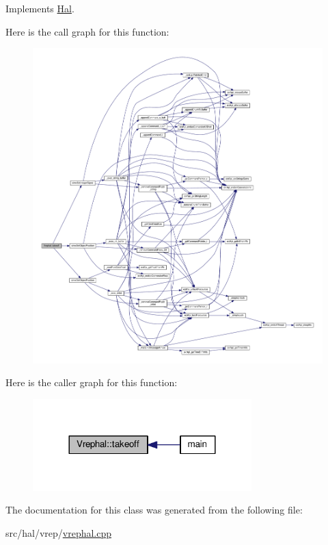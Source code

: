 Implements \hyperlink{class_hal_ac1968d088d9b905eb99fbe3f77d76757}{Hal}.



Here is the call graph for this function\+:
\nopagebreak
\begin{figure}[H]
\begin{center}
\leavevmode
\includegraphics[width=350pt]{class_vrephal_aeae911ac4d0f00bb8acc22b89e858d1c_cgraph}
\end{center}
\end{figure}




Here is the caller graph for this function\+:
\nopagebreak
\begin{figure}[H]
\begin{center}
\leavevmode
\includegraphics[width=240pt]{class_vrephal_aeae911ac4d0f00bb8acc22b89e858d1c_icgraph}
\end{center}
\end{figure}




The documentation for this class was generated from the following file\+:\begin{DoxyCompactItemize}
\item 
src/hal/vrep/\hyperlink{vrephal_8cpp}{vrephal.\+cpp}\end{DoxyCompactItemize}
